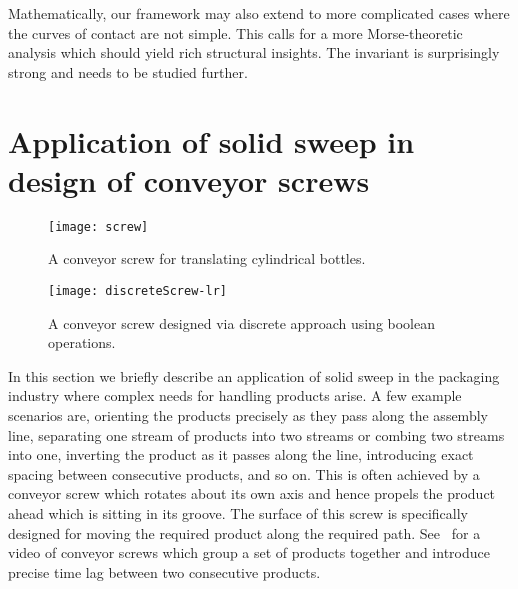 \documentclass{elsart5p}
\newcommand{\eat}[1]{}
\begin{document}
Mathematically, our framework may also extend to more complicated cases
where the curves of contact are not simple. This calls for a more
Morse-theoretic analysis which should yield rich structural insights. The
invariant  is surprisingly strong and needs to be studied
further.
\eat{
In this paper we give a complete characterization of the trim curves using 
decomposability and the zero-locus of the function .  
While the trim curves in decomposable sweeps can be computed by the existing 
surface-surface intersection algorithms, in non-decomposable sweeps 
this approach fails in the neighborhood of singular trim points.  We address this 
problem via the zero-locus of the function .
We give examples of simple, decomposable and non-decomposable to illustrate this. 

This work can be extended by computing the complete brep for the envelope which 
includes orienting the edges and faces of , computing adjacency relations between them, 
and so on.  The case when faces of  do not meet smoothly needs to be addressed.  
Sweeps in which the number of components of curve of contact changes with time also poses an 
interesting problem.
}

\appendix

\section{Application of solid sweep in design of conveyor screws}

\begin{figure}
 \centering
 \texttt{[image: screw]}
 \caption{A conveyor screw for translating cylindrical bottles.}
 \label{screwFig}
\end{figure}

\begin{figure}
 \centering
 \texttt{[image: discreteScrew-lr]}
 \caption{A conveyor screw designed via discrete approach using boolean operations.}
 \label{discreteScrewFig}
\end{figure}

In this section we briefly describe an application of solid sweep in the packaging industry 
where complex needs for handling products arise.  A few example scenarios are, orienting 
the products precisely as they pass along the assembly line, separating one stream of products 
into two streams or combing two streams into one, inverting the product as it passes along the line, 
introducing exact spacing between consecutive products, and so on. 
This is often achieved by a conveyor screw which rotates about its own axis and hence 
propels the product ahead which is sitting in its groove.
The surface of this screw is specifically designed for moving the required product 
along the required path.  See~\cite{scroll} for a video 
of conveyor screws which group a set of products together and introduce precise time lag between 
two consecutive products. 
\end{document}
